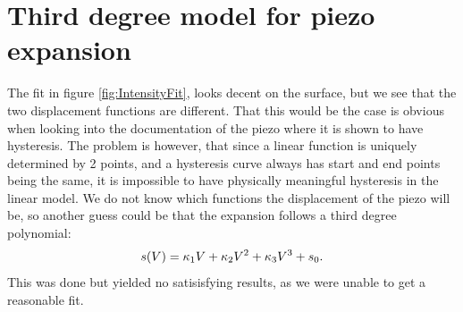 \section{Third degree model for piezo expansion}
The fit in figure \ref{fig:IntensityFit}, looks decent on the surface, but we see that the two displacement functions are different.
That this would be the case is obvious when looking into the documentation of the piezo \autocite{thorlabs_pa44lew_datasheet_2024} where it is shown to have hysteresis.
The problem is however, that since a linear function is uniquely determined by 2 points, and a hysteresis curve always has start and end points being the same, 
it is impossible to have physically meaningful hysteresis in the linear model.
We do not know which functions the displacement of the piezo will be, so another guess could be that the expansion follows a third degree polynomial:
$$s(V) = \kappa_{\textup{1}} V + \kappa_{\textup{2}} V^{2} + \kappa_{\textup{3}} V^{3} + s_0.$$
This was done but yielded no satisisfying results, as we were unable to get a reasonable fit.

